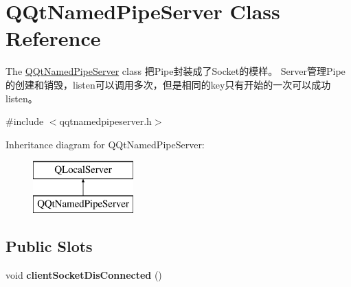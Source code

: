 \hypertarget{class_q_qt_named_pipe_server}{}\section{Q\+Qt\+Named\+Pipe\+Server Class Reference}
\label{class_q_qt_named_pipe_server}


The \mbox{\hyperlink{class_q_qt_named_pipe_server}{Q\+Qt\+Named\+Pipe\+Server}} class 把\+Pipe封装成了\+Socket的模样。 Server管理\+Pipe的创建和销毁，listen可以调用多次，但是相同的key只有开始的一次可以成功listen。  




{\ttfamily \#include $<$qqtnamedpipeserver.\+h$>$}

Inheritance diagram for Q\+Qt\+Named\+Pipe\+Server\+:\begin{figure}[H]
\begin{center}
\leavevmode
\includegraphics[height=2.000000cm]{class_q_qt_named_pipe_server}
\end{center}
\end{figure}
\subsection*{Public Slots}
\begin{DoxyCompactItemize}
\item 
\mbox{\label{class_q_qt_named_pipe_server_ad13103652dd04c3ded7a9be93dd38f5b}} 
void {\bfseries client\+Socket\+Dis\+Connected} ()
\end{DoxyCompactItemize}
